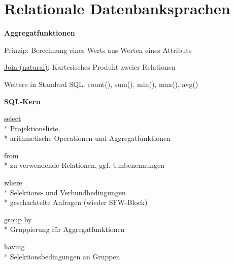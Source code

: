 \section{Relationale Datenbanksprachen}
\label{sec:sql}

\textbf{Aggregatfunktionen}
\begin{items}
	\item Prinzip: Berechnung eines Werts aus Werten eines Attributs
	\item \underline{Join (natural)}: Kartesisches Produkt zweier Relationen
	\item Weitere in Standard SQL: count(), sum(), min(), max(), avg()
\end{items}

\textbf{SQL-Kern}
\begin{items}
	\item \underline{select} \\*
		Projektionsliste, \\*
		arithmetische Operationen und Aggregatfunktionen
	\item \underline{from} \\*
		zu verwendende Relationen, ggf. Umbenennungen
	\item \underline{where} \\*
		Selektions- und Verbundbedingungen \\*
		geschachtelte Anfragen (wieder SFW-Block)
	\item \underline{group by} \\*
		Gruppierung für Aggregatfunktionen
	\item \underline{having} \\*
		Selektionsbedingungen an Gruppen
\end{items}